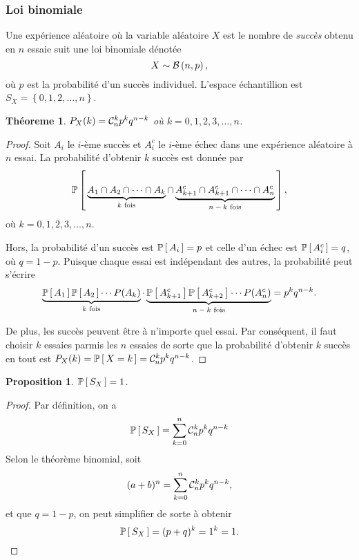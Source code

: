 \documentclass[11pt]{article}
\newcommand\comb[2]{%
	\ensuremath{%
		\mathcal{C}_{#2}^{#1}%
	}%
}%
\renewcommand\P[1]{%
	\ensuremath{%
		\mathbb{P}\left[\,#1\,\right]%
	}%
}%
\newcommand\Bin[2]{%
	\ensuremath{%
		\mathcal{B}\left(#1,#2\right)%
	}%
}%
\newtheorem{theoreme}{Théoreme}[section]
\newtheorem*{proposition}{Proposition}
\begin{document}
\subsubsection{Loi binomiale}
Une expérience aléatoire où la variable aléatoire $X$ est le nombre de
\textit{succès} obtenu en $n$ essaie suit une loi binomiale dénotée
\begin{equation*}
	X\sim\Bin{n}{p},
\end{equation*}
où $p$ est la probabilité d'un succès individuel. L'espace échantillion est
$S_X=\left\{0,1,2,\dots,n\right\}$.

\begin{theoreme}
	$P_X(k)=\comb{k}{n}p^kq^{n-k}$ où $k=0,1,2,3,\dots,n$.
\end{theoreme}

\begin{proof}
	Soit $A_i$ le $i$-ème succès et $A_i^c$ le $i$-ème échec dans une
	expérience aléatoire à $n$ essai. La probabilité d'obtenir $k$ succès est
	donnée par
	\begin{equation*}
		\P{
			\underbrace{A_1\cap A_2\cap\cdots\cap A_k}_\text{$k$ fois}
			\cap
			\underbrace{A_{k+1}^c\cap A_{k+1}^c\cap\cdots\cap A_n^c}_
			\text{$n-k$ fois}
		},
	\end{equation*}
	où $k=0,1,2,3,\dots,n$.

	Hors, la probabilité d'un succès est $\P{A_i}=p$ et celle d'un échec est
	$\P{A_i^c}=q$, où $q=1-p$. Puisque chaque essai est indépendant des autres,
	la probabilité peut s'écrire
	\begin{equation*}
		\underbrace{
			\P{A_1}\P{A_2}\cdots P(A_k)
		}_\text{$k$ fois}
		\cdot
		\underbrace{
			\P{A_{k+1}^c}\P{A_{k+2}^c}\cdots P(A_n^c)
		}_\text{$n-k$ fois}
		=p^kq^{n-k}.
	\end{equation*}

	De plus, les succès peuvent être à n'importe quel essai. Par conséquent,
	il faut choisir $k$ essaies parmis les $n$ essaies de sorte que la
	probabilité d'obtenir $k$ succès en tout est
	$P_X(k)=\P{X=k}=\comb{k}{n}p^kq^{n-k}$.
\end{proof}

\begin{proposition}
	$\P{S_X}=1$.
\end{proposition}

\begin{proof}
	Par définition, on a
	\begin{equation*}
		\P{S_X}=\sum_{k=0}^n\comb{k}{n}p^kq^{n-k}
	\end{equation*}
	Selon le théorème binomial, soit
	\begin{equation*}
		(a+b)^n=\sum_{k=0}^n\comb{k}{n}p^kq^{n-k},
	\end{equation*}
	et que $q=1-p$, on peut simplifier de sorte à obtenir
	\begin{equation*}
		\P{S_X}=(p+q)^k=1^k=1.\qedhere
	\end{equation*}
\end{proof}
\end{document}
